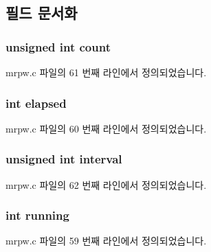 \subsection{필드 문서화}
\subsubsection[{\texorpdfstring{count}{count}}]{\setlength{\rightskip}{0pt plus 5cm}unsigned int count}\hypertarget{structwtimer_a16ff2d8e15ade4948398b0aeb80124a8}{}\label{structwtimer_a16ff2d8e15ade4948398b0aeb80124a8}


mrpw.\+c 파일의 61 번째 라인에서 정의되었습니다.

\subsubsection[{\texorpdfstring{elapsed}{elapsed}}]{\setlength{\rightskip}{0pt plus 5cm}int elapsed}\hypertarget{structwtimer_a4bd3978f9fa83a0e08225dca54a00eb6}{}\label{structwtimer_a4bd3978f9fa83a0e08225dca54a00eb6}


mrpw.\+c 파일의 60 번째 라인에서 정의되었습니다.

\subsubsection[{\texorpdfstring{interval}{interval}}]{\setlength{\rightskip}{0pt plus 5cm}unsigned int interval}\hypertarget{structwtimer_a23545cd41cdc93998f5b3caeb3e29936}{}\label{structwtimer_a23545cd41cdc93998f5b3caeb3e29936}


mrpw.\+c 파일의 62 번째 라인에서 정의되었습니다.

\subsubsection[{\texorpdfstring{running}{running}}]{\setlength{\rightskip}{0pt plus 5cm}int running}\hypertarget{structwtimer_a2f45113638a0b749a8a205d2cd7fb42b}{}\label{structwtimer_a2f45113638a0b749a8a205d2cd7fb42b}


mrpw.\+c 파일의 59 번째 라인에서 정의되었습니다.

